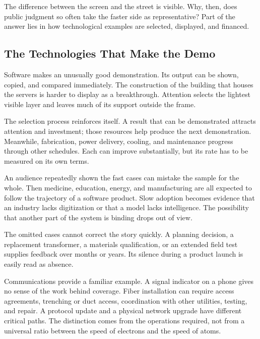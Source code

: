 The difference between the screen and the street is visible. Why, then, does public judgment so often take the faster side as representative? Part of the answer lies in how technological examples are selected, displayed, and financed.

\subsection{The Technologies That Make the Demo}


Software makes an unusually good demonstration. Its output can be shown, copied, and compared immediately. The construction of the building that houses the servers is harder to display as a breakthrough. Attention selects the lightest visible layer and leaves much of its support outside the frame.

The selection process reinforces itself. A result that can be demonstrated attracts attention and investment; those resources help produce the next demonstration. Meanwhile, fabrication, power delivery, cooling, and maintenance progress through other schedules. Each can improve substantially, but its rate has to be measured on its own terms.

An audience repeatedly shown the fast cases can mistake the sample for the whole. Then medicine, education, energy, and manufacturing are all expected to follow the trajectory of a software product. Slow adoption becomes evidence that an industry lacks digitization or that a model lacks intelligence. The possibility that another part of the system is binding drops out of view.

The omitted cases cannot correct the story quickly. A planning decision, a replacement transformer, a materials qualification, or an extended field test supplies feedback over months or years. Its silence during a product launch is easily read as absence.


Communications provide a familiar example. A signal indicator on a phone gives no sense of the work behind coverage. Fiber installation can require access agreements, trenching or duct access, coordination with other utilities, testing, and repair. A protocol update and a physical network upgrade have different critical paths. The distinction comes from the operations required, not from a universal ratio between the speed of electrons and the speed of atoms.

